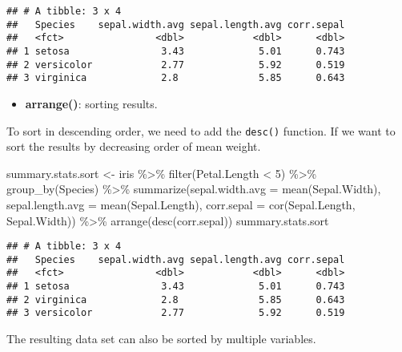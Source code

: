 \documentclass[
]{article}
\newenvironment{Shaded}{\begin{snugshade}}{\end{snugshade}}
\newcommand{\AttributeTok}[1]{\textcolor[rgb]{0.77,0.63,0.00}{#1}}
\newcommand{\DecValTok}[1]{\textcolor[rgb]{0.00,0.00,0.81}{#1}}
\newcommand{\FunctionTok}[1]{\textcolor[rgb]{0.00,0.00,0.00}{#1}}
\newcommand{\NormalTok}[1]{#1}
\newcommand{\OtherTok}[1]{\textcolor[rgb]{0.56,0.35,0.01}{#1}}
\newcommand{\SpecialCharTok}[1]{\textcolor[rgb]{0.00,0.00,0.00}{#1}}
\providecommand{\tightlist}{%
  \setlength{\itemsep}{0pt}\setlength{\parskip}{0pt}}
\begin{document}
\begin{verbatim}
## # A tibble: 3 x 4
##   Species    sepal.width.avg sepal.length.avg corr.sepal
##   <fct>                <dbl>            <dbl>      <dbl>
## 1 setosa                3.43             5.01      0.743
## 2 versicolor            2.77             5.92      0.519
## 3 virginica             2.8              5.85      0.643
\end{verbatim}

\begin{itemize}
\tightlist
\item
  \textbf{arrange()}: sorting results.
\end{itemize}

To sort in descending order, we need to add the \texttt{desc()}
function. If we want to sort the results by decreasing order of mean
weight.

\begin{Shaded}
\begin{Highlighting}[]
\NormalTok{summary.stats.sort }\OtherTok{\textless{}{-}}\NormalTok{ iris }\SpecialCharTok{\%\textgreater{}\%}
             \FunctionTok{filter}\NormalTok{(Petal.Length }\SpecialCharTok{\textless{}} \DecValTok{5}\NormalTok{) }\SpecialCharTok{\%\textgreater{}\%}
             \FunctionTok{group\_by}\NormalTok{(Species) }\SpecialCharTok{\%\textgreater{}\%}
             \FunctionTok{summarize}\NormalTok{(}\AttributeTok{sepal.width.avg =} \FunctionTok{mean}\NormalTok{(Sepal.Width),}
                       \AttributeTok{sepal.length.avg =} \FunctionTok{mean}\NormalTok{(Sepal.Length),}
                       \AttributeTok{corr.sepal =} \FunctionTok{cor}\NormalTok{(Sepal.Length, Sepal.Width)) }\SpecialCharTok{\%\textgreater{}\%}
              \FunctionTok{arrange}\NormalTok{(}\FunctionTok{desc}\NormalTok{(corr.sepal))}
\NormalTok{summary.stats.sort}
\end{Highlighting}
\end{Shaded}

\begin{verbatim}
## # A tibble: 3 x 4
##   Species    sepal.width.avg sepal.length.avg corr.sepal
##   <fct>                <dbl>            <dbl>      <dbl>
## 1 setosa                3.43             5.01      0.743
## 2 virginica             2.8              5.85      0.643
## 3 versicolor            2.77             5.92      0.519
\end{verbatim}

The resulting data set can also be sorted by multiple variables.
\end{document}
